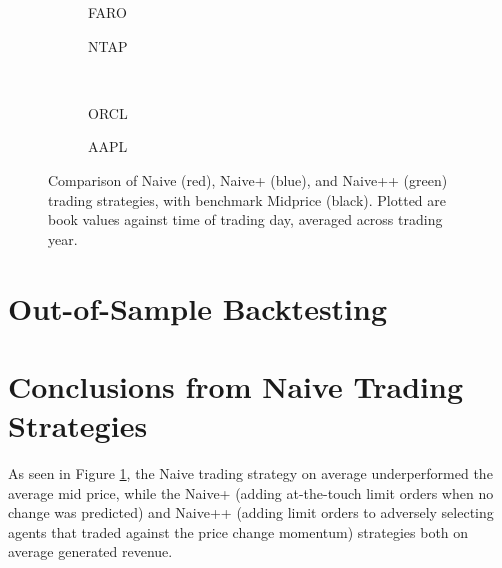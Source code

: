 \begin{figure}
\centering
\begin{subfigure}{.35\linewidth}
  \centering
  \setlength\figureheight{\linewidth} 
  \setlength\figurewidth{\linewidth}
  
  \caption{FARO}
\end{subfigure}%
\hfil%
\begin{subfigure}{.35\linewidth}
  \centering
  \setlength\figureheight{\linewidth}
  \setlength\figurewidth{\linewidth}
   
  \caption{NTAP}
\end{subfigure}\\
\vspace{1cm}
\begin{subfigure}{.35\linewidth}
  \centering
  \setlength\figureheight{\linewidth} 
  \setlength\figurewidth{\linewidth}
  
  \caption{ORCL}
\end{subfigure}%
\hfil%
\begin{subfigure}{.35\linewidth}
  \centering
  \setlength\figureheight{\linewidth}
  \setlength\figurewidth{\linewidth}
   
  \caption{AAPL}
\end{subfigure}%
  \caption{Comparison of Naive (red), Naive+ (blue), and Naive++ (green) trading strategies, with benchmark Midprice (black). Plotted are book values against time of trading day, averaged across trading year.}
  \label{fig:comp}
\end{figure}

\section{Out-of-Sample Backtesting}

\section{Conclusions from Naive Trading Strategies}

As seen in Figure \ref{fig:comp}, the Naive trading strategy on average underperformed the average mid price, while the Naive+ (adding at-the-touch limit orders when no change was predicted) and Naive++ (adding limit orders to adversely selecting agents that traded against the price change momentum) strategies both on average generated revenue. 

